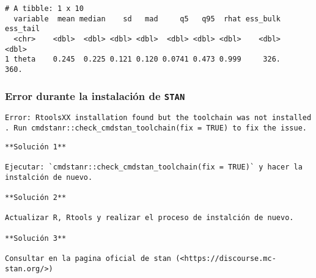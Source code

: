 \documentclass[
  letterpaper,
  DIV=11,
  numbers=noendperiod]{scrartcl}
\newenvironment{Shaded}{\begin{snugshade}}{\end{snugshade}}
\newcommand{\AttributeTok}[1]{\textcolor[rgb]{0.40,0.45,0.13}{#1}}
\newcommand{\FunctionTok}[1]{\textcolor[rgb]{0.28,0.35,0.67}{#1}}
\newcommand{\NormalTok}[1]{\textcolor[rgb]{0.00,0.23,0.31}{#1}}
\newcommand{\SpecialCharTok}[1]{\textcolor[rgb]{0.37,0.37,0.37}{#1}}
\newcommand{\StringTok}[1]{\textcolor[rgb]{0.13,0.47,0.30}{#1}}
\begin{document}
\begin{Shaded}
\end{Shaded}

\begin{verbatim}
# A tibble: 1 x 10
  variable  mean median    sd   mad     q5   q95  rhat ess_bulk ess_tail
  <chr>    <dbl>  <dbl> <dbl> <dbl>  <dbl> <dbl> <dbl>    <dbl>    <dbl>
1 theta    0.245  0.225 0.121 0.120 0.0741 0.473 0.999     326.     360.
\end{verbatim}

\hypertarget{error-durante-la-instalaciuxf3n-de-stan}{%
\subsubsection{\texorpdfstring{Error durante la instalación de
\texttt{STAN}}{Error durante la instalación de STAN}}\label{error-durante-la-instalaciuxf3n-de-stan}}

\texttt{Error:\ RtoolsXX\ installation\ found\ but\ the\ toolchain\ was\ not\ installed.\ Run\ cmdstanr::check\_cmdstan\_toolchain(fix\ =\ TRUE)\ to\ fix\ the\ issue.}

\begin{verbatim}
**Solución 1**    

Ejecutar: `cmdstanr::check_cmdstan_toolchain(fix = TRUE)` y hacer la instalción de nuevo. 

**Solución 2** 

Actualizar R, Rtools y realizar el proceso de instalción de nuevo. 

**Solución 3** 

Consultar en la pagina oficial de stan (<https://discourse.mc-stan.org/>)
\end{verbatim}
\end{document}
